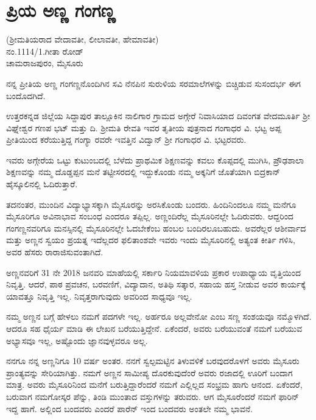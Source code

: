 {\fontsize{14}{16}\selectfont
\chapter{ಪ್ರಿಯ ಅಣ್ಣ   \eng{-}   ಗಂಗಣ್ಣ} 

\begin{center}
\smallskip

(ಶ್ರೀಮತಿಯರಾದ ವೇದಾವತೀ, ಲೀಲಾವತೀ, ಹೇಮಾವತೀ)\\
ನಂ.1114/1.ಗೀತಾ ರೋಡ್\\
ಚಾಮರಾಜಪುರಂ, ಮೈಸೂರು \\ 
\addrule
\end{center}

ನನ್ನ ಪ್ರೀತಿಯ ಅಣ್ಣ ಗಂಗಣ್ಣನೊಂದಿಗಿನ ಸವಿ ನೆನಪಿನ ಸುರುಳಿಯ ಸರಮಾಲೆ\-ಗಳನ್ನು ಬಿಚ್ಚಿಡುವ ಸುಸಂದರ್ಭ ಈಗ ಬಂದೊದಗಿದೆ.

ಉತ್ತರಕನ್ನಡ ಜಿಲ್ಲೆಯ ಸಿದ್ದಾಪುರ ತಾಲ್ಲೂಕಿನ ನಾಲಿಗಾರ ಗ್ರಾಮದ ಅಗ್ಗೇರೆ ನಿವಾಸಿ\-ಯಾದ ದಿವಂಗತ ವೇದಮೂರ್ತಿ ಶ್ರೀ ವಿಘ್ನೇಶ್ವರ ಗಣಪ ಭಟ್ ಮತ್ತು ದಿ. ಶ್ರೀಮತಿ ರೇವತಿ ಇವರ ತೃತೀಯ ಪುತ್ರನಾದ ಗಂಗಾಧರ ವಿ. ಭಟ್ಟ  ಅಪ್ಪ ಪ್ರೀತಿಯಿಂದ ಕರೆಯುತ್ತಿದ್ದ ಗಂಗ್ಯಾ ರವರೇ ಇವತ್ತಿನ ವಿದ್ವಾನ್ ಶ್ರೀ ಗಂಗಾಧರ ವಿ. ಭಟ್ಟರವರು.

ಇವರು ಅಗ್ಗೇರೆಯ ಒಟ್ಟು ಕುಟುಂಬದಲ್ಲಿ ಬೆಳೆದು ಪ್ರಾಥಮಿಕ ಶಿಕ್ಷಣವನ್ನು ಕವಲು\- ಕೊಪ್ಪದಲ್ಲಿ ಮುಗಿಸಿ, ಪ್ರೌಢಶಾಲಾ  ಶಿಕ್ಷಣವನ್ನು ನಮ್ಮ ದೊಡ್ಡಪ್ಪನ ಮನೆ ತಟ್ಟೀಸರದಲ್ಲಿ ಇದ್ದುಕೊಂಡು ನಮ್ಮ ಅಕ್ಕನಿಗೆ ಜೊತೆಯಾಗಿ  ಬಿದ್ರಕಾನ್ ಹೈಸ್ಕೂಲಿನಲ್ಲಿ ಓದಿರುತ್ತಾರೆ.

ತದನಂತರ, ಮುಂದಿನ ವಿದ್ಯಾಭ್ಯಾಸಕ್ಕಾಗಿ ಮೈಸೂರನ್ನು ಅರಸಿಕೊಂಡು ಬಂದರು. ಹಿಂದಿನಿಂದಲೂ ನಮ್ಮ ಮನೆಗೂ ಮೈಸೂರಿಗೂ ಅವಿನಾಭಾವ ಸಂಬಂಧ ಎಂದರೂ ತಪ್ಪಿಲ್ಲ.  ಅಣ್ಣಂದಿರೆಲ್ಲ ಮೈಸೂರಿನಲ್ಲೇ ಓದಿರುವರು. ಆದ್ದರಿಂದ ಗಂಗಣ್ಣನವರಿಗೂ ಮನಸ್ಸಿನಲ್ಲಿ ಮೈಸೂರಿನಲ್ಲೇ ಓದಬೇಕೆಂಬ ಹಂಬಲ ಬಂದಿರಲೂಬಹುದು.  ಅವರೆಲ್ಲರ ಆಶೀರ್ವಾದ ಮತ್ತು ಅಣ್ಣನ ಸ್ವಯಂ ಪ್ರಯತ್ನ ಇದೆಲ್ಲದರ ಫಲಿತಾಂಶವೇ ಇವರು ಇಂದು ಮೈಸೂರಿನಲ್ಲಿ ಅತ್ಯಂತ ಕೀರ್ತಿ ಗಳಿಸಿ, ಅವರ ಹೆಸರು ರಾರಾಜಿಸುವಂತಾಗಿದೆ.

ಅಣ್ಣನವರಿಗೆ 31 ನೇ 2018 ಜನವರಿ ಮಾಹೆಯಲ್ಲಿ ಸರ್ಕಾರಿ ನಿಯಮಾವಳಿಯ ಪ್ರಕಾರ ಉಪಾಧ್ಯಾಯ ವೃತ್ತಿಯಿಂದ  ನಿವೃತ್ತಿ.  ಆದರೆ,  ಪಾಠ  \enginline{-}  ಪ್ರವಚನ, ಬರವಣಿಗೆ, ವಿದ್ಯಾದಾನ, ಅತಿಥಿ ಸತ್ಕಾರ, ಸಹಾಯ ಹಸ್ತ ನೀಡುವ ಅವರ ಕಾರ್ಯಕ್ಕೆ ಯಾವತ್ತೂ  ನಿವೃತ್ತಿ ಇಲ್ಲ. ನಿವೃತ್ತರಾಗುವುದು ಅವರಿಂದ ಸಾಧ್ಯವೂ ಇಲ್ಲ.

ನಮ್ಮ ಅಣ್ಣನ ಬಗ್ಗೆ ಹೇಳಲು ನಮಗೆ ಪದಗಳೇ ಇಲ್ಲ. ಅರ್ಹರೂ ಅಲ್ಲವೇನೋ ಎಂಬ ಸಣ್ಣ ಸಂಶಯವೂ ನಮ್ಮೊಳಗಿದೆ.  ಆದರೂ ಸಹ ಧೈರ್ಯ ಮಾಡಿ ಈ ಲೇಖನ ಬರೆಯುತ್ತಿದ್ದೇನೆ. ಏಕೆಂದರೆ, ಅವರು ಬರೆಯುವಂತೆ ನಮಗೆ ಬರೆಯುವ ಅಭ್ಯಾಸವೂ ಇಲ್ಲ, ಅಷ್ಟೊಂದು ಜ್ಞಾನವುಳ್ಳವರೂ ಅಲ್ಲ.

ನನಗೂ ನನ್ನ ಅಣ್ಣನಿಗೂ 10 ವರ್ಷ ಅಂತರ. ನನಗೆ ಸ್ವಲ್ಪಮಟ್ಟಿನ \hbox{ತಿಳುವಳಿಕೆ} ಬರವುದರೊಳಗೆ ಅವರು ಮೈಸೂರು ಪ್ರಾಂತ್ಯವನ್ನು ಸೇರಿಯಾಗಿತ್ತು.  ನಮಗೆ ಅಣ್ಣನ ಸಾಮೀಪ್ಯ ದೊರಕುವುದೆಂರೆ ಅವರು ರಜಾದಲ್ಲಿ ಊರಿಗೆ ಬಂದಾಗ ಮಾತ್ರ.  ಅವರು ಮೈಸೂರಿನಿಂದ ಮನೆಗೆ ಬರುತ್ತಿದ್ದಾರೆಂದರೆ ನಮಗೆ ಎಲ್ಲಿಲ್ಲದ ಸಂಭ್ರಮ ಹಾಗು ಆನಂದ.  ಏಕೆಂದರೆ, ಬರುವಾಗ ನಮಗೋಸ್ಕರ ಪೆನ್ನು, ತಿಂಡಿ ಮುಂತಾದ ವಸ್ತುಗಳನ್ನು ತರುವರು. ಆಗ ಮೈಸೂರೆಂದರೆ ನಮಗೆ ಫಾರಿನ್ ಇದ್ದ ಹಾಗೆ. ಅಲ್ಲಿಂದ ಬಂದವರು ಎಂದರೆ ಪಾರೆನ್ ಇಂದ ಬಂದವರು ಅಂತಲೇ ನಮ್ಮ ಭಾವನೆ.

}
